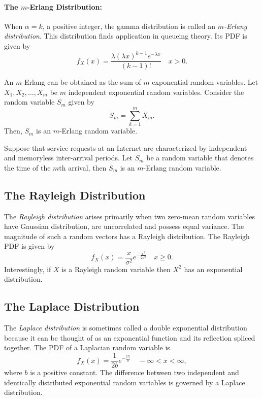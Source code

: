 \paragraph{The $m$-Erlang Distribution:}
When $\alpha = k$, a positive integer, the gamma distribution is called an \emph{$m$-Erlang distribution}.
This distribution finds application in queueing theory.
Its PDF is given by
\begin{equation*}
f_X (x) = \frac{\lambda (\lambda x)^{k - 1} e^{-\lambda x}}{(k-1)!} \quad  x > 0.
\end{equation*}

An $m$-Erlang can be obtained as the sum of $m$ exponential random variables.
Let $X_1, X_2, \ldots, X_m$ be $m$ independent exponential random variables.
Consider the random variable $S_m$ given by
\begin{equation*}
S_m = \sum_{k=1}^m X_m.
\end{equation*}
Then, $S_m$ is an $m$-Erlang random variable.

\begin{example}
Suppose that service requests at an Internet are characterized by independent and memoryless inter-arrival periods.
Let $S_m$ be a random variable that denotes the time of the $m$th arrival, then $S_m$ is an $m$-Erlang  random variable.
\end{example}


\subsection{The Rayleigh Distribution}

The \emph{Rayleigh distribution} arises primarily when two zero-mean random variables have Gaussian distribution, are uncorrelated and possess equal variance. 
The magnitude of such a random vectors has a Rayleigh distribution.
The Rayleigh PDF is given by
\begin{equation*}
f_X (x) = \frac{x}{\sigma^2} e^{- \frac{x^2}{2 \sigma^2} } \quad x \geq 0 .
\end{equation*}
Interestingly, if $X$ is a Rayleigh random variable then $X^2$ has an exponential distribution.


\subsection{The Laplace Distribution}
The \emph{Laplace distribution} is sometimes called a double exponential distribution because it can be thought of as an exponential function and its reflection spliced together. 
The PDF of a Laplacian random variable is
\begin{equation*}
f_X (x) = \frac{1}{2b} e^{- \frac{|x|}{b}} \quad - \infty < x < \infty,
\end{equation*}
where $b$ is a positive constant.
The difference between two independent and identically distributed exponential random variables is governed by a Laplace distribution.


